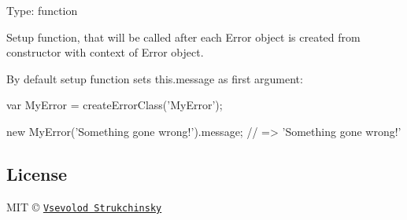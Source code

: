 Type\+: {\ttfamily function}

Setup function, that will be called after each Error object is created from constructor with context of Error object.

By default {\ttfamily setup} function sets {\ttfamily this.\+message} as first argument\+:


\begin{DoxyCode}
var MyError = createErrorClass('MyError');

new MyError('Something gone wrong!').message; // => 'Something gone wrong!'
\end{DoxyCode}


\subsection*{License}

M\+IT © \href{http://github.com/floatdrop}{\tt Vsevolod Strukchinsky} 